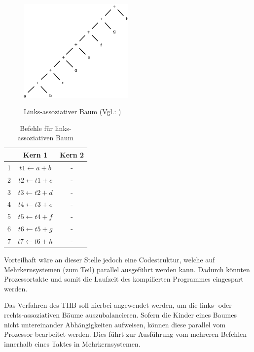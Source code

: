 \begin{figure}
	\begin{center}
		\includegraphics[width=0.5\textwidth]{images/links_assoziativer_baum}\\
	\end{center}
	\caption[Links-assoziativer Baum]{Links-assoziativer Baum (Vgl.: \cite{HeBIS-309344573})}
	\label{fig:links-assoziativer-baum}
\end{figure}

\begin{table}
	\begin{center}
		\begin{tabular}{|c|c|c|}
			\hline  & Kern 1 & Kern 2 \\ 
			\hline 1 & $ t1 \leftarrow a + b $& - \\ 
			\hline 2 & $ t2 \leftarrow t1 + c $& - \\ 
			\hline 3 & $ t3 \leftarrow t2 + d $& - \\ 
			\hline 4 & $ t4 \leftarrow t3 + e $& - \\ 
			\hline 5 & $ t5 \leftarrow t4 + f $& - \\ 
			\hline 6 & $ t6 \leftarrow t5 + g $& - \\ 
			\hline 7 & $ t7 \leftarrow t6 + h $& - \\ 
			\hline 
		\end{tabular}
	\end{center}
	\caption{Befehle für links-assoziativen Baum}
	\label{tab:links-assoziativer-baum}
\end{table}


Vorteilhaft wäre an dieser Stelle jedoch eine Codestruktur, welche auf Mehrkernsystemen (zum Teil) parallel ausgeführt werden kann. Dadurch könnten Prozessortakte und somit die Laufzeit des kompilierten Programmes eingespart werden.

Das Verfahren des \ac{THB} soll hierbei angewendet werden, um die links- oder rechts-assoziativen Bäume auszubalancieren. Sofern die Kinder eines Baumes nicht untereinander Abhängigkeiten aufweisen, können diese parallel vom Prozessor bearbeitet werden. Dies führt zur Ausführung vom mehreren Befehlen innerhalb eines Taktes in Mehrkernsystemen.

